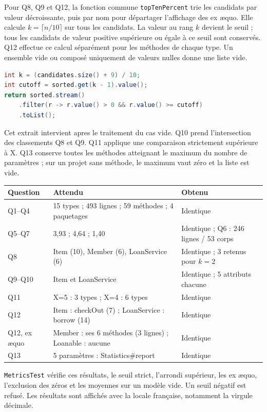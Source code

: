 \documentclass[11pt,a4paper]{article}
\newcommand{\code}[1]{\texttt{#1}}
\begin{document}
Pour Q8, Q9 et Q12, la fonction commune \code{topTenPercent} trie les candidats par valeur décroissante, puis par nom pour départager l'affichage des ex æquo. Elle calcule $k=\lceil n/10\rceil$ sur tous les candidats. La valeur au rang $k$ devient le seuil ; tous les candidats de valeur positive supérieure ou égale à ce seuil sont conservés. Q12 effectue ce calcul séparément pour les méthodes de chaque type. Un ensemble vide ou composé uniquement de valeurs nulles donne une liste vide.
\begin{lstlisting}[language=Java]
int k = (candidates.size() + 9) / 10;
int cutoff = sorted.get(k - 1).value();
return sorted.stream()
    .filter(r -> r.value() > 0 && r.value() >= cutoff)
    .toList();
\end{lstlisting}
Cet extrait intervient apres le traitement du cas vide. Q10 prend l'intersection des classements Q8 et Q9. Q11 applique une comparaison strictement supérieure à X. Q13 conserve toutes les méthodes atteignant le maximum du nombre de paramètres ; sur un projet sans méthode, le maximum vaut zéro et la liste est vide.

\begin{center}
\begin{tabularx}{\textwidth}{lXX}
\toprule
Question & Attendu & Obtenu\\
\midrule
Q1--Q4 & 15 types ; 493 lignes ; 59 méthodes ; 4 paquetages & Identique\\
Q5--Q7 & 3,93 ; 4,64 ; 1,40 & Identique ; Q6 : 246 lignes / 53 corps\\
Q8 & Item (10), Member (6), LoanService (6) & Identique ; 3 retenus pour $k=2$\\
Q9--Q10 & Item et LoanService & Identique ; 5 attributs chacune\\
Q11 & X=5 : 3 types ; X=4 : 6 types & Identique\\
Q12 & Item : checkOut (7) ; LoanService : borrow (14) & Identique\\
Q12, ex æquo & Member : ses 6 méthodes (3 lignes) ; Loanable : aucune & Identique\\
Q13 & 5 paramètres : Statistics\#report & Identique\\
\bottomrule
\end{tabularx}
\end{center}

\code{MetricsTest} vérifie ces résultats, le seuil strict, l'arrondi supérieur, les ex æquo, l'exclusion des zéros et les moyennes sur un modèle vide. Un seuil négatif est refusé. Les résultats sont affichés avec la locale française, notamment la virgule décimale.
\end{document}
